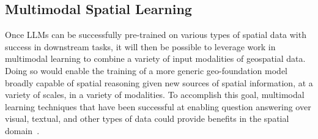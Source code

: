 \subsection{Multimodal Spatial Learning}
Once LLMs can be successfully pre-trained on various types of spatial data with success in downstream tasks, it will then be possible to leverage work in multimodal learning to combine a variety of input modalities of geospatial data.
Doing so would enable the training of a more generic geo-foundation model broadly capable of spatial reasoning given new sources of spatial information, at a variety of scales, in a variety of modalities.
To accomplish this goal, multimodal learning techniques that have been successful at enabling question answering over visual, textual, and other types of data could provide benefits in the spatial domain~\cite{Fei2022}.